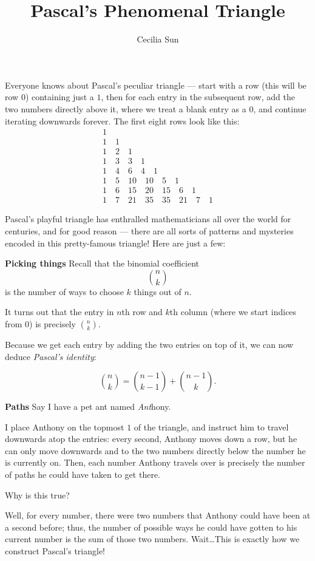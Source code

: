 \documentclass{article}
\title{Pascal’s Phenomenal Triangle}
\author{Cecilia Sun}
\begin{document}
\maketitle
Everyone knows about Pascal’s peculiar triangle --- start with a row (this will be row $0$) containing just a $1$, then for each entry in the subsequent row, add the two numbers directly above it, where we treat a blank entry as a $0$, and continue iterating downwards forever. The first eight rows look like this:
\[\begin{array}{c}1\\1\quad 1\\1\quad 2\quad 1\\1\quad 3\quad 3\quad 1\\1\quad 4\quad 6\quad 4\quad 1\\1\quad 5\quad 10\quad 10\quad 5\quad 1\\1\quad 6\quad 15\quad 20\quad 15\quad 6\quad 1\\1\quad 7\quad 21\quad 35\quad 35\quad 21\quad 7\quad 1\end{array}\] %

Pascal’s playful triangle has enthralled mathematicians all over the world for centuries, and for good reason --- there are all sorts of patterns and mysteries encoded in this pretty-famous triangle! Here are just a few:

\textbf{Picking things}
Recall that the binomial coefficient 
\[
	\binom nk
\]
is the number of ways to choose $k$ things out of $n$. 

It turns out that the entry in $n$th row and $k$th column (where we start indices from $0$) is precisely $\binom nk$.

Because we get each entry by adding the two entries on top of it, we can now deduce \textit{Pascal's identity}:

\[\binom nk=\binom{n-1}{k-1}+\binom{n-1}k.\]

\textbf{Paths}
Say I have a pet ant named \textit{Ant}hony. 

I place Anthony on the topmost $1$ of the triangle, and instruct him to travel downwards atop the entries: every second, Anthony moves down a row, but he can only move downwards and to the two numbers directly below the number he is currently on.
Then, each number Anthony travels over is precisely the number of paths he could have taken to get there. 

Why is this true? 

Well, for every number, there were two numbers that Anthony could have been at a second before; thus, the number of possible ways he could have gotten to his current number is the sum of those two numbers. Wait\dots This is exactly how we construct Pascal's triangle!
\end{document}
